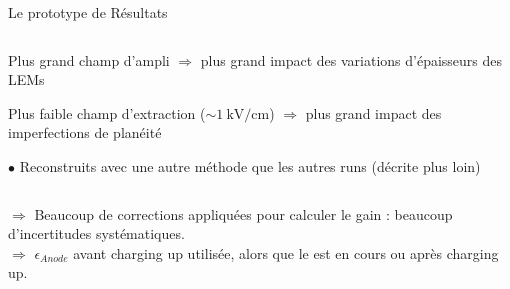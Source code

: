 \begin{frame}{Le prototype de \TOO{}}{Résultats}
\begin{scriptsize}
\begin{columns}
\begin{column}{0.5\textwidth}
\begin{itemize}
\begin{itemize}
                                \begin{scriptsize}
                                    \item Plus grand champ d'ampli $\Rightarrow$ plus grand impact des variations d'épaisseurs des LEMs
                                     \item Plus faible champ d'extraction ($\sim \SI{1}{\kilo\volt\per\centi\meter}$) $\Rightarrow$ plus grand impact des imperfections de planéité
                                    \item[$\bullet$] Reconstruits avec une autre méthode que les autres runs (décrite plus loin)
                                \end{scriptsize}
                            \end{itemize}
                    \end{itemize}
                \end{column}
            \end{columns}\vspace{0.2cm}
            $\Rightarrow$ Beaucoup de corrections appliquées pour calculer le gain : beaucoup d'incertitudes systématiques.\\
            $\Rightarrow$ $\epsilon_{Anode}$ avant charging up utilisée, alors que le \TOO{} est en cours ou après charging up.
        \end{scriptsize}
    \end{frame}

    

